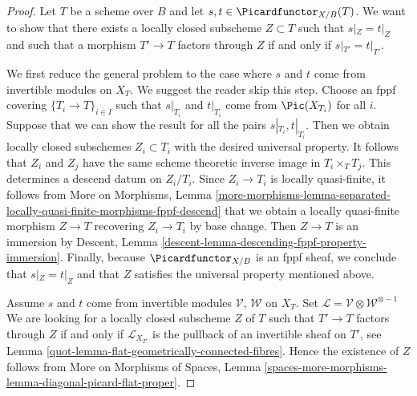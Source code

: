 \begin{proof}

Let $T$ be a scheme over $B$ and let $s, t \in \Picardfunctor_{X/B}(T)$.
We want to show that there exists a locally closed subscheme $Z \subset T$
such that $s|_Z = t|_Z$ and such that a morphism $T' \to T$ factors
through $Z$ if and only if $s|_{T'} = t|_{T'}$.

\medskip\noindent
We first reduce the general problem to the case where $s$ and $t$ come
from invertible modules on $X_T$. We suggest the reader skip this step.
Choose an fppf covering $\{T_i \to T\}_{i \in I}$ such that
$s|_{T_i}$ and $t|_{T_i}$ come from $\Pic(X_{T_i})$ for all $i$.
Suppose that we can show the result for all the pairs
$s|_{T_i}, t|_{T_i}$. Then we obtain locally closed subschemes
$Z_i \subset T_i$ with the desired universal property.
It follows that $Z_i$ and $Z_j$ have the same scheme theoretic
inverse image in $T_i \times_T T_j$.
This determines a descend datum on $Z_i/T_i$.
Since $Z_i \to T_i$ is locally quasi-finite, it follows from
More on Morphisms, Lemma
\ref{more-morphisms-lemma-separated-locally-quasi-finite-morphisms-fppf-descend}
that we obtain a locally quasi-finite morphism $Z \to T$
recovering $Z_i \to T_i$ by base change. Then $Z \to T$ is an immersion
by Descent, Lemma \ref{descent-lemma-descending-fppf-property-immersion}.
Finally, because $\Picardfunctor_{X/B}$ is an fppf sheaf, we conclude
that $s|_Z = t|_Z$ and that $Z$ satisfies the universal property
mentioned above.

\medskip\noindent
Assume $s$ and $t$ come from invertible modules $\mathcal{V}$, $\mathcal{W}$
on $X_T$.
Set $\mathcal{L} = \mathcal{V} \otimes \mathcal{W}^{\otimes -1}$
We are looking for a locally closed subscheme $Z$ of $T$
such that $T' \to T$ factors through $Z$ if and only if $\mathcal{L}_{X_{T'}}$
is the pullback of an invertible sheaf on $T'$, see
Lemma \ref{quot-lemma-flat-geometrically-connected-fibres}.
Hence the existence of $Z$ follows from
More on Morphisms of Spaces, Lemma
\ref{spaces-more-morphisms-lemma-diagonal-picard-flat-proper}.
\end{proof}

